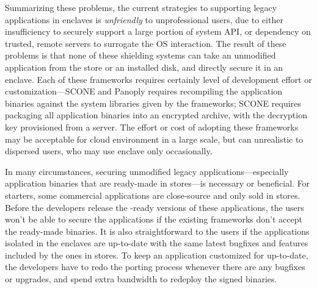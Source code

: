 Summarizing these problems, 
the current strategies to supporting legacy applications in enclaves
is {\em unfriendly} to unprofessional users,
due to either insufficiency to securely support a large portion of system API,
or dependency on trusted, remote servers to surrogate the OS interaction.
The result of these problems is that none of these \sgx{} shielding systems
can take an unmodified application from the store or an installed disk,
and directly secure it in an enclave.
Each of these frameworks requires certainly level of development effort or customization---SCONE and Panoply requires recompiling the application binaries against the system libraries given by the frameworks;
SCONE requires packaging all application binaries into an encrypted archive,
with the decryption key provisioned from a server.
The effort or cost of adopting these frameworks may be acceptable for cloud environment in a large scale,
but can unrealistic to dispersed users, who may use enclave only occasionally.




In many circumstances, securing unmodified legacy applications---especially application binaries that are ready-made in stores---is necessary or beneficial.
For starters, some commercial applications are close-source and only sold in stores.
Before the developers release the \sgx{}-ready versions of these applications, the users won't be able to secure the applications if the existing frameworks don't accept the ready-made binaries.
It is also straightforward to the users if the applications isolated in the enclaves are up-to-date with the same latest bugfixes and features included by the ones in stores.
To keep an application customized for \sgx{} up-to-date,
the developers have to redo the porting process whenever there are any bugfixes or upgrades,
and spend extra bandwidth to redeploy the signed binaries.





